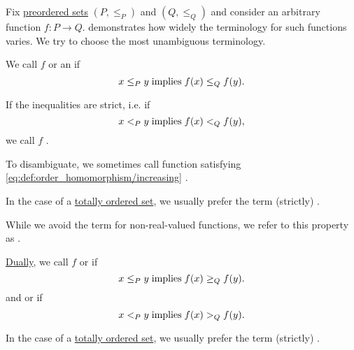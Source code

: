 \begin{definition}\label{def:order_homomorphism}
  Fix \hyperref[def:preordered_set]{preordered sets} \( (P, \leq_P) \) and \( (Q, \leq_Q) \) and consider an arbitrary function \( f: P \to Q \).  demonstrates how widely the terminology for such functions varies. We try to choose the most unambiguous terminology.

  \begin{thmenum}
     We call \( f \)  or an  if
    \begin{equation}\label{eq:def:order_homomorphism/increasing}
      x \leq_P y \T{implies} f(x) \leq_Q f(y).
    \end{equation}

    If the inequalities are strict, i.e. if
    \begin{equation}\label{eq:def:order_homomorphism/increasing/strict}
      x <_P y \T{implies} f(x) <_Q f(y),
    \end{equation}
    we call \( f \) .

    To disambiguate, we sometimes call function satisfying \eqref{eq:def:order_homomorphism/increasing} .

    In the case of a \hyperref[def:totally_ordered_set]{totally ordered set}, we usually prefer the term (strictly) .

    While we avoid the term  for non-real-valued functions, we refer to this property as .

     \hyperref[thm:preorder_duality]{Dually}, we call \( f \)  or  if
    \begin{equation}\label{eq:def:order_homomorphism/decreasing}
      x \leq_P y \T{implies} f(x) \geq_Q f(y).
    \end{equation}
    and  or  if
    \begin{equation}\label{eq:def:order_homomorphism/decreasing/strict}
      x <_P y \T{implies} f(x) >_Q f(y).
    \end{equation}

    In the case of a \hyperref[def:totally_ordered_set]{totally ordered set}, we usually prefer the term (strictly) .


\end{thmenum}
\end{definition}
